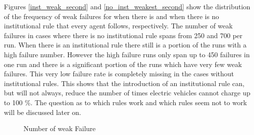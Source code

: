\documentclass[a4paper]{article}
\begin{document}
Figures \ref{inst_weak_second} and \ref{no_inst_weakest_second}  show the distribution of the frequency of weak failures  for 
when there is and when there is no institutional rule that every agent follows, respectively. The number of weak failures in cases
where there is no institutional  rule spans from 250 and 700 per run. When there is an institutional rule there still is a portion of the 
runs with a high failure number. However the high failure runs only span up to 450 failures in one run and there is a significant 
portion of the runs which have very few weak failures. This very low failure rate is completely missing in the cases without 
institutional rules. This shows that the introduction of an institutional rule can, but will not always, reduce the number of times
electric vehicles cannot charge up to 100 \%. The question as to which rules work and which rules seem not to work will be discussed 
later on. \\
\begin{figure}[!ht]
\caption{Number of weak Failure}
\label{weakest_second}
\end{figure} \\
\end{document}
